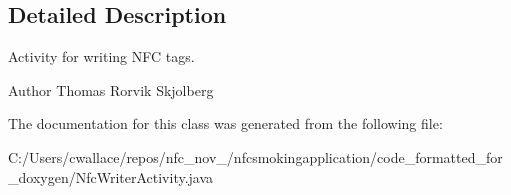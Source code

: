 \subsection{Detailed Description}
Activity for writing N\-F\-C tags.

\begin{DoxyAuthor}{Author}
Thomas Rorvik Skjolberg 
\end{DoxyAuthor}


The documentation for this class was generated from the following file\-:\begin{DoxyCompactItemize}
\item 
C\-:/\-Users/cwallace/repos/nfc\-\_\-nov\-\_/nfcsmokingapplication/code\-\_\-formatted\-\_\-for\-\_\-doxygen/Nfc\-Writer\-Activity.\-java\end{DoxyCompactItemize}
